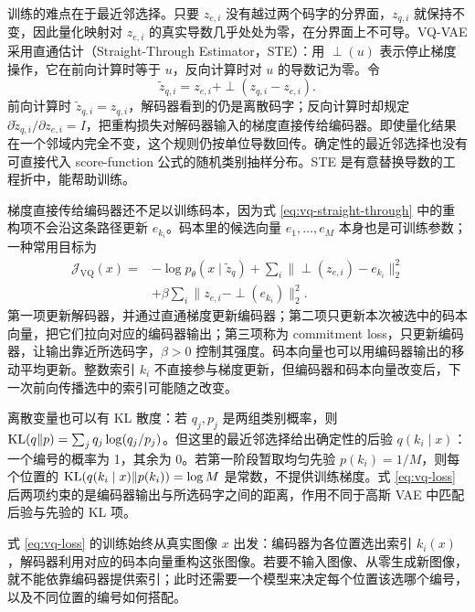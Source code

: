 训练的难点在于最近邻选择。只要 \(z_{e,i}\) 没有越过两个码字的分界面，\(z_{q,i}\) 就保持不变，因此量化映射对 \(z_{e,i}\) 的真实导数几乎处处为零，在分界面上不可导。VQ-VAE 采用直通估计（Straight-Through Estimator，STE）：用 \(\perp(u)\) 表示停止梯度操作，它在前向计算时等于 \(u\)，反向计算时对 \(u\) 的导数记为零。令
\begin{equation}
 \widetilde z_{q,i}=z_{e,i}+\perp(z_{q,i}-z_{e,i}).
 \label{eq:vq-straight-through}
\end{equation}
前向计算时 \(\widetilde z_{q,i}=z_{q,i}\)，解码器看到的仍是离散码字；反向计算时却规定 \(\partial\widetilde z_{q,i}/\partial z_{e,i}=I\)，把重构损失对解码器输入的梯度直接传给编码器。即使量化结果在一个邻域内完全不变，这个规则仍按单位导数回传。确定性的最近邻选择也没有可直接代入 score-function 公式的随机类别抽样分布。STE 是有意替换导数的工程折中，能帮助训练。

梯度直接传给编码器还不足以训练码本，因为式 \eqref{eq:vq-straight-through} 中的重构项不会沿这条路径更新 \(e_{k_i}\)。码本里的候选向量 \(e_1,\ldots,e_M\) 本身也是可训练参数；一种常用目标为
\begin{equation}
\begin{aligned}
 \mathcal J_{\mathrm{VQ}}(x)
 ={}&-\log p_\theta(x\mid\widetilde z_q)
 +\sum_i\|\perp(z_{e,i})-e_{k_i}\|_2^2\\
 &+\beta\sum_i\|z_{e,i}-\perp(e_{k_i})\|_2^2.
\end{aligned}
\label{eq:vq-loss}
\end{equation}
第一项更新解码器，并通过直通梯度更新编码器；第二项只更新本次被选中的码本向量，把它们拉向对应的编码器输出；第三项称为 commitment loss，只更新编码器，让输出靠近所选码字，\(\beta>0\) 控制其强度。码本向量也可以用编码器输出的移动平均更新。整数索引 \(k_i\) 不直接参与梯度更新，但编码器和码本向量改变后，下一次前向传播选中的索引可能随之改变。

离散变量也可以有 KL 散度：若 \(q_j,p_j\) 是两组类别概率，则 \(\mathrm{KL}(q\Vert p)=\sum_j q_j\log(q_j/p_j)\)。但这里的最近邻选择给出确定性的后验 \(q(k_i\mid x)\)：一个编号的概率为 1，其余为 0。若第一阶段暂取均匀先验 \(p(k_i)=1/M\)，则每个位置的 \(\mathrm{KL}(q(k_i\mid x)\Vert p(k_i))=\log M\) 是常数，不提供训练梯度。式 \eqref{eq:vq-loss} 后两项约束的是编码器输出与所选码字之间的距离，作用不同于高斯 VAE 中匹配后验与先验的 KL 项。

式 \eqref{eq:vq-loss} 的训练始终从真实图像 \(x\) 出发：编码器为各位置选出索引 \(k_i(x)\)，解码器利用对应的码本向量重构这张图像。若要不输入图像、从零生成新图像，就不能依靠编码器提供索引；此时还需要一个模型来决定每个位置该选哪个编号，以及不同位置的编号如何搭配。

